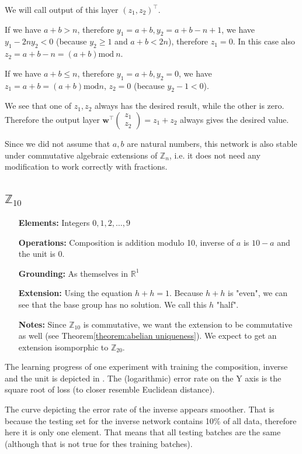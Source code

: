We will call output of this layer $(z_1,z_2)^\top$. 

If we have $a+b>n$, therefore $y_1=a+b, y_2=a+b-n+1$, we have $y_1-2ny_2<0$ (because $y_2\geq 1$ and $a+b<2n$), therefore $z_1=0$. In this case also $z_2=a+b-n=(a+b)\text{mod}\ n$.

If we have $a+b\leq n$, therefore $y_1=a+b,y_2=0$, we have $z_1=a+b=(a+b)\text{mod} n$, $z_2=0$ (because $y_2-1<0$).

We see that one of $z_1,z_2$ always has the desired result, while the other is zero. Therefore the output layer $\textbf{w}^\top \left(\begin{matrix}
z_1\\
z_2
\end{matrix}\right)=z_1+z_2$ always gives the desired value.

Since we did not assume that $a,b$ are natural numbers, this network is also stable under commutative algebraic extensions of $\mathbb{Z}_n$, i.e. it does not need any modification to work correctly with fractions.
\subsection{$\mathbb{Z}_{10}$}

\begin{itemize}
	\item[\textbf{Elements:}] Integers $0,1,2,\dots,9$
	\item[\textbf{Operations:}] Composition is addition modulo 10, inverse of $a$ is $10-a$ and the unit is 0.
	\item[\textbf{Grounding:}] As themselves in $\mathbb{R}^1$
	\item[\textbf{Extension:}] Using the equation $h+h=1$. Because $h+h$ is "even", we can see that the base group has no solution. We call this $h$ "half".
	\item[\textbf{Notes:}] Since $\mathbb{Z}_{10}$ is commutative, we want the extension to be commutative as well (see Theorem\autoref{theorem:abelian uniqueness}). We expect to get an extension isomporphic to $\mathbb{Z}_{20}$.
\end{itemize}

The learning progress of one experiment with training the composition, inverse and the unit is depicted in . The (logarithmic) error rate on the Y axis is the square root of loss (to closer resemble Euclidean distance).

The curve depicting the error rate of the inverse appears smoother. That is because the testing set for the inverse network contains 10\% of all data, therefore here it is only one element. That means that all testing batches are the same (although that is not true for thes training batches).

